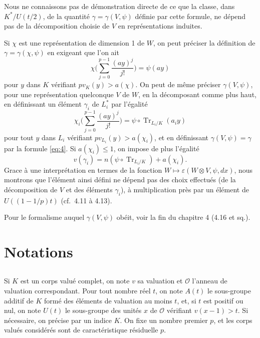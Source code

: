 \documentclass[12pt,a4paper]{article}
\theoremstyle{plain}
\theoremstyle{definition}
\theoremstyle{remark}
\DeclareMathOperator{\Tr}{Tr}
\newcommand{\cO}{\mathcal{O}}
\providecommand{\cO}{\mathcal{O}}
\providecommand{\Tr}{\operatorname{Tr}}
\begin{document}
Nous ne connaissons pas de d\'emonstration directe de ce que la classe, dans $K^*/U(t/2)$, de la quantit\'e $\gamma = \gamma(V, \psi)$ d\'efinie par cette formule, ne d\'epend pas de la d\'ecomposition choisie de $V$ en repr\'esentations induites.

Si $\chi$ est une repr\'esentation de dimension 1 de $W$, on peut pr\'eciser la d\'efinition de $\gamma = \gamma(\chi, \psi)$ en exigeant que l'on ait
\[
\chi\biggl(\sum_{j=0}^{p-1} \frac{(ay)^j}{j!}\biggr) = \psi(ay)
\]
pour $y$ dans $K$ v\'erifiant $pv_K(y) > a(\chi)$. On peut de m\^eme pr\'eciser $\gamma(V, \psi)$, pour une repr\'esentation quelconque $V$ de $W$, en la d\'ecomposant comme plus haut, en d\'efinissant un \'el\'ement $\gamma_i$ de $L_i^*$ par l'\'egalit\'e
\[
\chi_i\biggl(\sum_{j=0}^{p-1} \frac{(ay)^j}{j!}\biggr) = \psi \circ \Tr_{L_i/K}(a_i y)
\]
pour tout $y$ dans $L_i$ v\'erifiant $pv_{L_i}(y) > a(\chi_i)$, et en d\'efinissant $\gamma(V, \psi) = \gamma$ par la formule \eqref{eq:4}. Si $a(\chi_i) \leq 1$, on impose de plus l'\'egalit\'e
\[
v(\gamma_i) = n(\psi \circ \Tr_{L_i/K}) + a(\chi_i).
\]
Grace \`a une interpr\'etation en termes de la fonction $W \mapsto \varepsilon(W \otimes V, \psi, dx)$, nous montrons que l'\'el\'ement ainsi d\'efini ne d\'epend pas des choix effectu\'es (de la d\'ecomposition de $V$ et des \'el\'ements $\gamma_i$), \`a multiplication pr\`es par un \'el\'ement de $U((1-1/p)t)$ (cf.~4.11 \`a 4.13).

Pour le formalisme auquel $\gamma(V, \psi)$ ob\'eit, voir la fin du chapitre 4 (4.16 et sq.).


\section{Notations}
\label{sec:0}

\setcounter{subsection}{-1}

\subsection{}
\label{sec:0.1}

Si $K$ est un corps valu\'e complet, on note $v$ sa valuation et $\cO$ l'anneau de valuation correspondant. Pour tout nombre r\'eel $t$, on note $A(t)$ le sous-groupe additif de $K$ form\'e des \'el\'ements de valuation au moins $t$, et, si $t$ est positif ou nul, on note $U(t)$ le sous-groupe des unit\'es $x$ de $\cO$ v\'erifiant $v(x-1) > t$. Si n\'ecessaire, on pr\'ecise par un indice $K$. On fixe un nombre premier $p$, et les corps valu\'es consid\'er\'es sont de caract\'eristique r\'esiduelle $p$.
\end{document}
